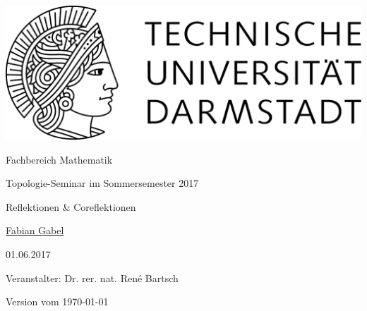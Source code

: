 \begin{titlepage}
  \begin{center}
    \vspace{1cm}
    \includegraphics[width=0.5\linewidth]{TU_Darmstadt_Logo.pdf}
    \vspace{12pt}
    
    \large{Fachbereich Mathematik}
    \vspace{2cm}
    
    \large{Topologie-Seminar im Sommersemester 2017}
    \vspace{2cm}

    \huge{Reflektionen \& Coreflektionen}
    
    \vspace*{2cm}    
    
		\large
                \href{mailto:gabel@mathematik.tu-darmstadt.de}{Fabian Gabel}
    \vspace*{.5cm}

    01.06.2017 \\
    \vspace*{1cm}

    Veranstalter: Dr. rer. nat. Ren\'e Bartsch

    \vspace*{.5cm}

    \tiny{Version vom \today}
  \end{center}
\end{titlepage}
\vspace*{\fill}
